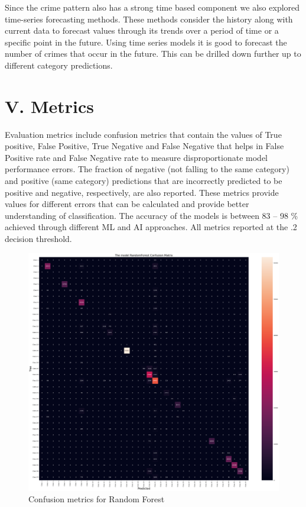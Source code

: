 \documentclass[11 pt,conference,final,]{IEEEtran}
\begin{document}
Since the crime pattern also has a strong time based component we also
explored time-series forecasting methods. These methods consider the
history along with current data to forecast values through its trends
over a period of time or a specific point in the future. Using time
series models it is good to forecast the number of crimes that occur in
the future. This can be drilled down further up to different category
predictions.

\section{V. Metrics}\label{v.-metrics}

Evaluation metrics include confusion metrics that contain the values of
True positive, False Positive, True Negative and False Negative that
helps in False Positive rate and False Negative rate to measure
disproportionate model performance errors. The fraction of negative (not
falling to the same category) and positive (same category) predictions
that are incorrectly predicted to be positive and negative,
respectively, are also reported. These metrics provide values for
different errors that can be calculated and provide better understanding
of classification. The accuracy of the models is between 83 -- 98 \%
achieved through different ML and AI approaches. All metrics reported at
the .2 decision threshold.

\begin{figure}

{\centering \includegraphics[width=0.8\linewidth]{img/fig12} 

}

\caption{Confusion metrics for Random Forest}\label{fig:unnamed-chunk-12}
\end{figure}
\end{document}
